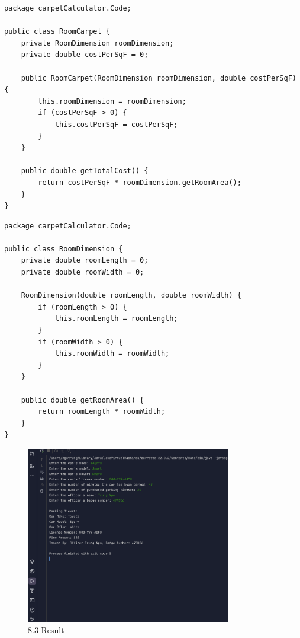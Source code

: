 \documentclass{article}
\begin{document}
\begin{lstlisting}[caption=RoomCarpet.java]
package carpetCalculator.Code;

public class RoomCarpet {
    private RoomDimension roomDimension;
    private double costPerSqF = 0;

    public RoomCarpet(RoomDimension roomDimension, double costPerSqF) {
        this.roomDimension = roomDimension;
        if (costPerSqF > 0) {
            this.costPerSqF = costPerSqF;
        }
    }

    public double getTotalCost() {
        return costPerSqF * roomDimension.getRoomArea();
    }
}
\end{lstlisting}

\begin{lstlisting}[caption=RoomDimension.java]
package carpetCalculator.Code;

public class RoomDimension {
    private double roomLength = 0;
    private double roomWidth = 0;

    RoomDimension(double roomLength, double roomWidth) {
        if (roomLength > 0) {
            this.roomLength = roomLength;
        }
        if (roomWidth > 0) {
            this.roomWidth = roomWidth;
        }
    }

    public double getRoomArea() {
        return roomLength * roomWidth;
    }
}
\end{lstlisting}

\begin{figure}[H]
    \centering
    \includegraphics[width=0.8\textwidth]{./Assets/Results/Assignment12/1.png}
    \caption{8.3 Result}
\end{figure}
\end{document}
